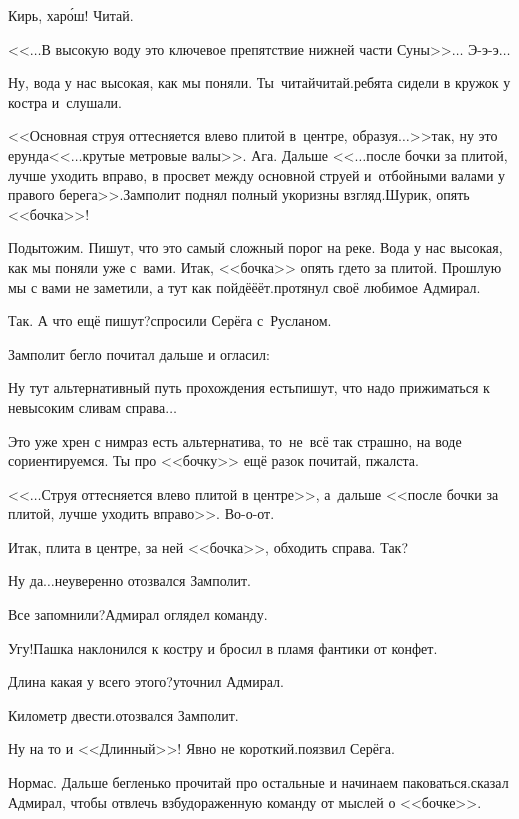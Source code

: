 \diagdash Кирь, хар\'ош! Читай.

\diagdash <<$\ldots$В высокую воду это ключевое препятствие нижней части Суны>>$\ldots$ Э-э-э$\ldots$ %

\diagdash Ну, вода у нас высокая, как мы поняли. Ты~читай\sdash читай.\mdash ребята сидели в кружок у костра и~слушали.

\diagdash <<Основная струя оттесняется влево плитой в~центре, образуя$\ldots$>>\mdash так, ну это ерунда\mdash <<$\ldots$крутые метровые валы>>. Ага. Дальше <<$\ldots$после бочки за плитой, лучше уходить вправо, в просвет между основной струей и~отбойными валами у правого берега>>.\mdash Замполит поднял полный укоризны взгляд.\mdash Шурик, опять <<бочка>>!

\diagdash Подытожим. Пишут, что это самый сложный порог на реке. Вода у нас высокая, как мы поняли уже с~вами. Итак, <<бочка>> опять где\sdash то за плитой. Прошлую мы с вами не заметили, а тут как пойдё\sdash ё\sdash ёт.\mdash протянул своё любимое Адмирал.

\diagdash Так. А что ещё пишут?\mdash спросили Серёга с~Русланом.

Замполит бегло почитал дальше и огласил:

\diagdash Ну тут альтернативный путь прохождения есть\mdash пишут, что надо прижиматься к невысоким сливам справа$\ldots$

\diagdash Это уже хрен с ним\mdash раз есть альтернатива, то~не~всё так страшно, на воде сориентируемся. Ты про <<бочку>> ещё разок почитай, п\sdash жалста.

\diagdash <<$\ldots$Струя оттесняется влево плитой в центре>>, а~дальше <<после бочки за плитой, лучше уходить вправо>>. Во-о-от.

\diagdash Итак, плита в центре, за ней <<бочка>>, обходить справа. Так?

\diagdash Ну да$\ldots$\mdash неуверенно отозвался Замполит.

\diagdash Все запомнили?\mdash Адмирал оглядел команду.

\diagdash Угу!\mdash Пашка наклонился к костру и бросил в пламя фантики от конфет.

\diagdash Длина какая у всего этого?\mdash уточнил Адмирал.

\diagdash Километр двести.\mdash отозвался Замполит.

\diagdash Ну на то и <<Длинный>>! Явно не короткий.\mdash поязвил Серёга.

\diagdash Нормас. Дальше бегленько прочитай про остальные и начинаем паковаться.\mdash сказал Адмирал, чтобы отвлечь взбудораженную команду от мыслей о <<бочке>>.

